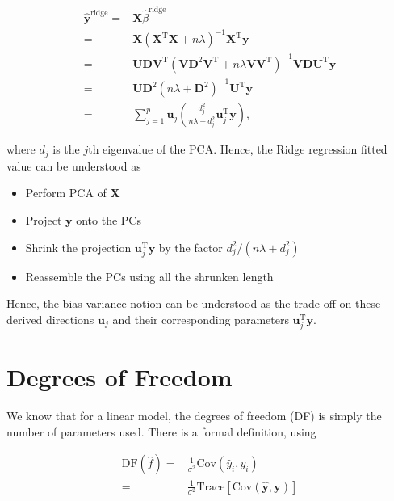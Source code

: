 \documentclass[
]{book}
\providecommand{\tightlist}{%
  \setlength{\itemsep}{0pt}\setlength{\parskip}{0pt}}
\theoremstyle{definition}
\theoremstyle{definition}
\theoremstyle{definition}
\theoremstyle{definition}
\theoremstyle{remark}
\begin{document}
\begin{align}
\widehat{\mathbf{y}}^\text{ridge} =& \mathbf{X}\widehat{\beta}^\text{ridge} \\ 
=& \mathbf{X}(\mathbf{X}^\text{T}\mathbf{X}+ n \lambda)^{-1} \mathbf{X}^\text{T}\mathbf{y}\\
=& \mathbf{U}\mathbf{D}\mathbf{V}^\text{T}( \mathbf{V}\mathbf{D}^2 \mathbf{V}^\text{T}+ n \lambda \mathbf{V}\mathbf{V}^\text{T})^{-1} \mathbf{V}\mathbf{D}\mathbf{U}^\text{T}\mathbf{y}\\
=& \mathbf{U}\mathbf{D}^2 (n \lambda + \mathbf{D}^2)^{-1} \mathbf{U}^\text{T}\mathbf{y}\\
=& \sum_{j = 1}^p \mathbf{u}_j \left( \frac{d_j^2}{n \lambda + d_j^2} \mathbf{u}_j^\text{T}\mathbf{y}\right),
\end{align}

where \(d_j\) is the \(j\)th eigenvalue of the PCA. Hence, the Ridge regression fitted value can be understood as

\begin{itemize}
\tightlist
\item
  Perform PCA of \(\mathbf{X}\)
\item
  Project \(\mathbf{y}\) onto the PCs
\item
  Shrink the projection \(\mathbf{u}_j^\text{T}\mathbf{y}\) by the factor \(d_j^2 / (n \lambda + d_j^2)\)
\item
  Reassemble the PCs using all the shrunken length
\end{itemize}

Hence, the bias-variance notion can be understood as the trade-off on these derived directions \(\mathbf{u}_j\) and their corresponding parameters \(\mathbf{u}_j^\text{T}\mathbf{y}\).

\hypertarget{degrees-of-freedom}{%
\section{Degrees of Freedom}\label{degrees-of-freedom}}

We know that for a linear model, the degrees of freedom (DF) is simply the number of parameters used. There is a formal definition, using

\begin{align}
\text{DF}(\widehat{f}) =& \frac{1}{\sigma^2} \text{Cov}(\widehat{y}_i, y_i)\\
=& \frac{1}{\sigma^2} \text{Trace}[\text{Cov}(\widehat{\mathbf{y}}, \mathbf{y})]
\end{align}
\end{document}
